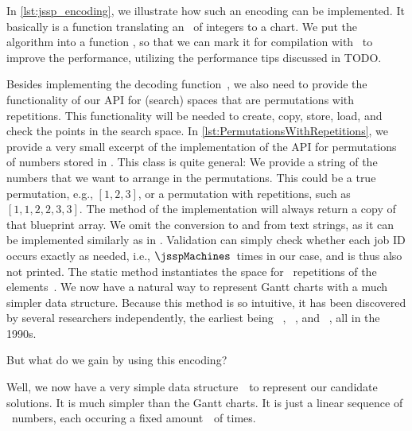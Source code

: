 In \cref{lst:jssp_encoding}, we illustrate how such an encoding can be implemented.
It basically is a function translating an \numpyndarray\ of integers to a  chart.
We put the algorithm into a function , so that we can mark it for compilation with \numba\ to improve the performance, utilizing the performance tips discussed in TODO.


Besides implementing the decoding function~\decode, we also need to provide the functionality of our  API for (search) spaces that are permutations with repetitions.
This functionality will be needed to create, copy, store, load, and check the points in the search space.
In \cref{lst:PermutationsWithRepetitions}, we provide a very small excerpt of the implementation of the  API for permutations of numbers stored in \numpyndarrays.
This class is quite general:
We provide a  string of the numbers that we want to arrange in the permutations.
This could be a true permutation, e.g., $[1, 2, 3]$, or a permutation with repetitions, such as $[1, 1, 2, 2, 3, 3]$.
The  method of the  implementation will always return a copy of that blueprint array.
We omit the conversion to and from text strings, as it can be implemented similarly as in .
Validation can simply check whether each job ID occurs exactly as needed, i.e., $\jsspMachines$~times in our case, and is thus also not printed.
The static method  instantiates the space for \jsspMachines~repetitions of the elements~.%
%
\endhsection%
%
%
%
We now have a natural way to represent Gantt charts with a much simpler data structure.
Because this method is so intuitive, it has been discovered by several researchers independently, the earliest being \citeauthor{GTK1994SJSSPBGA}~\cite{GTK1994SJSSPBGA}, \citeauthor{B1995AGPATJSSWGA}~\cite{B1995AGPATJSSWGA,BMK1996OPRFSP}, and \citeauthor{SIS1997NESFSJSPBGA}~\cite{SIS1997NESFSJSPBGA}, all in the 1990s.

But what do we gain by using this encoding?

Well, we now have a very simple data structure~\searchSpace\ to represent our candidate solutions.
It is much simpler than the Gantt charts.
It is just a linear sequence of \jsspJobs~numbers, each occuring a fixed amount~\jsspMachines\ of times.

